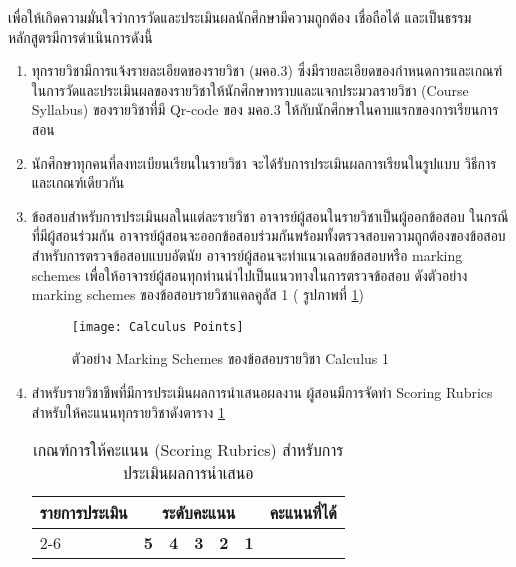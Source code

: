 \begin{doclist}
\end{doclist}

เพื่อให้เกิดความมั่นใจว่าการวัดและประเมินผลนักศึกษามีความถูกต้อง เชื่อถือได้ และเป็นธรรม หลักสูตรมี​การดำเนินการดังนี้
\begin{enumerate}
\item ทุกรายวิชามีการแจ้งรายละเอียดของรายวิชา (มคอ.3) ซึ่งมีรายละเอียดของกำหนดการและเกณฑ์ในการวัดและประเมินผลของรายวิชาให้นักศึกษาทราบและแจกประมวลรายวิชา (Course Syllabus) ของรายวิชาที่มี Qr-code ของ มคอ.3 ให้กับนักศึกษาในคาบแรกของการเรียนการสอน
\item นักศึกษาทุกคนที่ลงทะเบียนเรียนในรายวิชา จะได้รับการประเมินผลการเรียนในรูปแบบ วิธีการ และเกณฑ์เดียวกัน
\item ข้อสอบสำหรับการประเมินผลในแต่ละรายวิชา อาจารย์ผู้สอนในรายวิชาเป็นผู้ออกข้อสอบ ในกรณีที่มีผู้สอนร่วมกัน อาจารย์ผู้สอนจะออกข้อสอบร่วมกันพร้อมทั้งตรวจสอบความถูกต้องของข้อสอบ สำหรับการตรวจข้อสอบแบบอัตนัย อาจารย์ผู้สอนจะทำแนวเฉลยข้อสอบหรือ marking schemes เพื่อให้อาจารย์ผู้สอนทุกท่านนำไปเป็นแนวทางในการตรวจข้อสอบ ดังตัวอย่าง marking schemes ของข้อสอบรายวิชาแคลคูลัส 1 (
รูปภาพที่ \ref{Picture:Marking Schemes})
\begin{figure}[h!]
	\texttt{[image: Calculus Points]}\\
	\caption{ตัวอย่าง Marking Schemes ของข้อสอบรายวิชา Calculus 1}
	\label{Picture:Marking Schemes}
\end{figure}
\item สำหรับรายวิชาชีพที่มีการประเมินผลการนำเสนอผลงาน ผู้สอนมีการจัดทำ Scoring Rubrics สำหรับให้คะแนนทุกรายวิชาดังตาราง \ref{table: Scoring Rubrics}

\renewcommand{\arraystretch}{1.5} %

\begin{longtable}{|p{3cm}|p{1.8cm}|p{1.8cm}|p{1.8cm}|p{1.8cm}|p{1.8cm}|p{1cm}|}
		\caption{เกณฑ์การให้คะแนน (Scoring Rubrics) สำหรับการประเมินผลการนำเสนอ}
	\label{table: Scoring Rubrics}\\
	\hline
	\centering\textbf{รายการประเมิน}&\multicolumn{5}{c|}{\textbf{ระดับคะแนน}}&\textbf{คะแนน\newline ที่ได้}\\ \cline{2-6}
	& \centering\textbf{5} & \centering\textbf{4} & \centering\textbf{3} & \centering\textbf{2} & \centering\textbf{1} &  \\
	\hline
	\endfirsthead
	

\end{longtable}
\end{enumerate}
